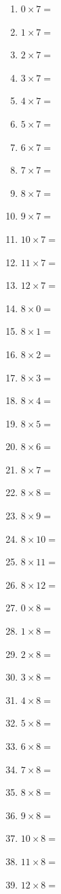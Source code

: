 \documentclass{article}
\begin{document}
\begin{multicols}{4}
\begin{enumerate}
\item $0 \times 7 =$
\item $1 \times 7 =$
\item $2 \times 7 =$
\item $3 \times 7 =$
\item $4 \times 7 =$
\item $5 \times 7 =$
\item $6 \times 7 =$
\item $7 \times 7 =$
\item $8 \times 7 =$
\item $9 \times 7 =$
\item $10 \times 7 =$
\item $11 \times 7 =$
\item $12 \times 7 =$

\item $8 \times 0 =$
\item $8 \times 1 =$
\item $8 \times 2 =$
\item $8 \times 3 =$
\item $8 \times 4 =$
\item $8 \times 5 =$
\item $8 \times 6 =$
\item $8 \times 7 =$
\item $8 \times 8 =$
\item $8 \times 9 =$
\item $8 \times 10 =$
\item $8 \times 11 =$
\item $8 \times 12 =$

\item $0 \times 8 =$
\item $1 \times 8 =$
\item $2 \times 8 =$
\item $3 \times 8 =$
\item $4 \times 8 =$
\item $5 \times 8 =$
\item $6 \times 8 =$
\item $7 \times 8 =$
\item $8 \times 8 =$
\item $9 \times 8 =$
\item $10 \times 8 =$
\item $11 \times 8 =$
\item $12 \times 8 =$


\end{enumerate}
\end{multicols}
\end{document}
